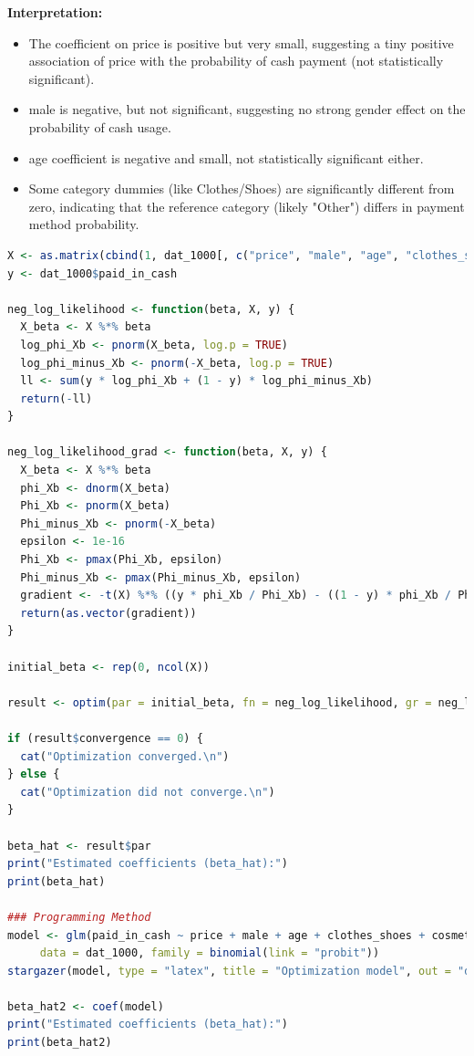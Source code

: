 \documentclass[a4paper,12pt]{article} %
\theoremstyle{nonitalic}
\newenvironment{solution}[1]
  {\renewcommand\theinnercustomsol{#1}\innercustomsol}
  {\endinnercustomsol}
\newcounter{solutionctr}[section]
\renewcommand{\thesolutionctr}{(\alph{solutionctr})}
\newenvironment{autosolution}
  {\stepcounter{solutionctr}\begin{solution}{\thesolutionctr}}
  {\end{solution}}
\begin{document}
\begin{autosolution}
    \textbf{Interpretation:}

    \begin{itemize}
        \item The coefficient on price is positive but very small, suggesting a tiny positive association
        of price with the probability of cash payment (not statistically significant).
        \item male is negative, but not significant, suggesting no strong gender effect on the
        probability of cash usage.
        \item age coefficient is negative and small, not statistically significant either.
        \item Some category dummies (like Clothes/Shoes) are significantly different from zero,
              indicating that the reference category (likely "Other") differs in payment method probability.            
    \end{itemize}
    

    \begin{lstlisting}[language=R]
X <- as.matrix(cbind(1, dat_1000[, c("price", "male", "age", "clothes_shoes", "cosmetics", "food", "technology")]))
y <- dat_1000$paid_in_cash

neg_log_likelihood <- function(beta, X, y) {
  X_beta <- X %*% beta
  log_phi_Xb <- pnorm(X_beta, log.p = TRUE)
  log_phi_minus_Xb <- pnorm(-X_beta, log.p = TRUE)
  ll <- sum(y * log_phi_Xb + (1 - y) * log_phi_minus_Xb)
  return(-ll)
}

neg_log_likelihood_grad <- function(beta, X, y) {
  X_beta <- X %*% beta
  phi_Xb <- dnorm(X_beta)
  Phi_Xb <- pnorm(X_beta)
  Phi_minus_Xb <- pnorm(-X_beta)
  epsilon <- 1e-16
  Phi_Xb <- pmax(Phi_Xb, epsilon)
  Phi_minus_Xb <- pmax(Phi_minus_Xb, epsilon)
  gradient <- -t(X) %*% ((y * phi_Xb / Phi_Xb) - ((1 - y) * phi_Xb / Phi_minus_Xb))
  return(as.vector(gradient))
}

initial_beta <- rep(0, ncol(X))

result <- optim(par = initial_beta, fn = neg_log_likelihood, gr = neg_log_likelihood_grad, X = X, y = y, method = "BFGS")

if (result$convergence == 0) {
  cat("Optimization converged.\n")
} else {
  cat("Optimization did not converge.\n")
}

beta_hat <- result$par
print("Estimated coefficients (beta_hat):")
print(beta_hat)

### Programming Method
model <- glm(paid_in_cash ~ price + male + age + clothes_shoes + cosmetics + food + technology, 
     data = dat_1000, family = binomial(link = "probit"))
stargazer(model, type = "latex", title = "Optimization model", out = "d.tex")

beta_hat2 <- coef(model)
print("Estimated coefficients (beta_hat):")
print(beta_hat2)
    \end{lstlisting}
\end{autosolution}
\end{document}

